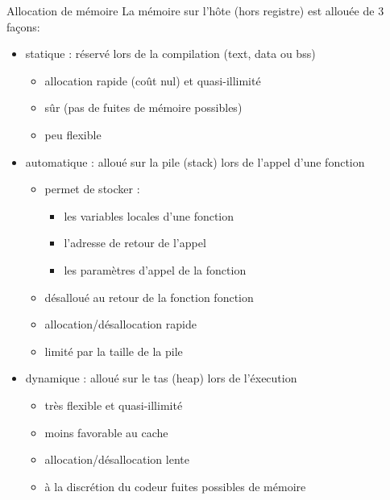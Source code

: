 \documentclass[11pt,mathserif]{beamer}
\newcommand{\scout}{\faAngellist}
\newcommand{\gezi}{\faLongArrowRight}
\newcommand{\argi}{\faLightbulbO}
\newcommand{\kontuz}{\faExclamationTriangle}
\newcommand{\pozik}{\faSmileO}
\newcommand{\triste}{\faFrownO}
\newif\ifC
\begin{document}
\begin{frame}{Allocation de mémoire}
La mémoire sur l'hôte (hors registre) est allouée de 3 façons: 
\begin{itemize}[<+->]
  \item statique : réservé lors de la compilation (text, data ou bss)
    \begin{itemize}
      \item[\pozik] allocation rapide (coût nul) et quasi-illimité
      \item[\pozik] sûr (pas de fuites de mémoire possibles)
      \item[\triste] peu flexible
    \end{itemize}
  \item automatique : alloué sur la pile (stack) lors de l'appel d'une fonction
    \begin{itemize}
      \item[\scout] permet de stocker : 
      \begin{itemize}
        \item les variables locales d'une fonction
        \item l'adresse de retour de l'appel
        \item les paramètres d'appel de la fonction
      \end{itemize}
    \item[\argi] désalloué au retour de la fonction fonction
      \item[\pozik] allocation/désallocation rapide
      \item[\kontuz] limité par la taille de la pile
    \end{itemize}
  \item dynamique : alloué sur le tas (heap) lors de l'éxecution
  \begin{itemize}
      \item[\pozik] très flexible et quasi-illimité
      \item[\triste] moins favorable au cache
      \item[\triste] allocation/désallocation lente
      \item[\kontuz] à la discrétion du codeur \gezi fuites possibles de mémoire
    \end{itemize}
\end{itemize}
\end{frame}
\ifC
\end{document}
